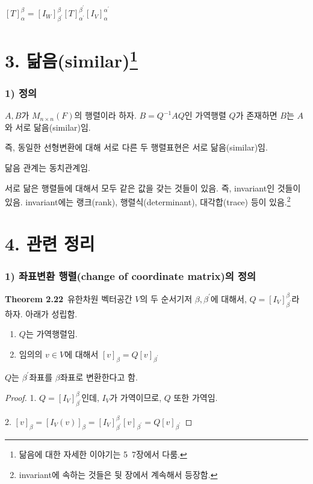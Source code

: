 \begin{center}
$[T]_{\alpha}^{\beta}=[I_W]_{\beta^\prime}^{\beta}[T]_{\alpha^{\prime}}^{\beta^{\prime}}[I_V]_{\alpha}^{\alpha^{\prime}}$\\
\end{center}


\section*{3. 닮음(similar)\footnote{닮음에 대한 자세한 이야기는 5~7장에서 다룸.}}
\subsubsection*{1) 정의\\}
\begin{DEF}
$A,B$가 $M_{n \times n}(F)$의 행렬이라 하자. $B=Q^{-1}AQ$인 가역행렬 $Q$가 존재하면 $B$는 $A$와 서로 닮음(similar)임.
\end{DEF}

즉, 동일한 선형변환에 대해 서로 다른 두 행렬표현은 서로 닮음(similar)임.

닮음 관계는 동치관계임.

서로 닮은 행렬들에 대해서 모두 같은 값을 갖는 것들이 있음. 즉, invariant인 것들이 있음. invariant에는 랭크(rank), 행렬식(determinant), 대각합(trace) 등이 있음.\footnote{invariant에 속하는 것들은 뒷 장에서 계속해서 등장함.}


\newpage


\section*{4. 관련 정리}
\subsubsection*{1) 좌표변환 행렬(change of coordinate matrix)의 정의}
\textbf{Theorem 2.22}\, 유한차원 벡터공간 $V$의 두 순서기저 $\beta, \beta^{\prime}$에 대해서, $Q=[I_V]^{\beta}_{\beta^{\prime}}$라 하자. 아래가 성립함.

\begin{enumerate}
    \item $Q$는 가역행렬임.
    \item 임의의 $v \in V$에 대해서 $[v]_{\beta}=Q[v]_{\beta^{\prime}}$
\end{enumerate}

$Q$는 $\beta^{\prime}$좌표를 $\beta$좌표로 변환한다고 함.

\begin{proof}
1. $Q=[I_V]^{\beta}_{\beta^{\prime}}$인데, $I_V$가 가역이므로, $Q$ 또한 가역임.

2. $[v]_{\beta}=[I_V(v)]_{\beta}=[I_V]_{\beta^{\prime}}^{\beta}[v]_{\beta^{\prime}}=Q[v]_{\beta^{\prime}}$
\end{proof}

